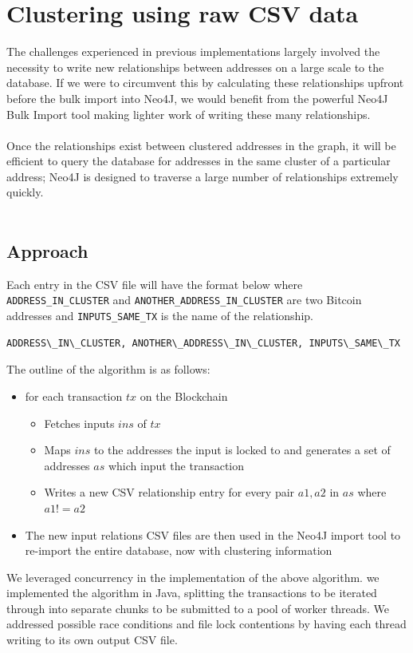 \section{Clustering using raw CSV data}\label{clustering-raw-csv}
The challenges experienced in previous implementations largely involved the necessity to write new relationships between addresses on a large scale to the database. If we were to circumvent this by calculating these relationships upfront before the bulk import into Neo4J, we would benefit from the powerful Neo4J Bulk Import tool making lighter work of writing these many relationships. 
\\\\
Once the relationships exist between clustered addresses in the graph, it will be efficient to query the database for addresses in the same cluster of a particular address;  Neo4J is designed to traverse a large number of relationships extremely quickly. 
\\\\

\subsection{Approach}
Each entry in the CSV file will have the format below where \texttt{ADDRESS\_IN\_CLUSTER} and \texttt{ANOTHER\_ADDRESS\_IN\_CLUSTER} are two Bitcoin addresses and \texttt{INPUTS\_SAME\_TX} is the name of the relationship. 

\begin{lstlisting}
ADDRESS\_IN\_CLUSTER, ANOTHER\_ADDRESS\_IN\_CLUSTER, INPUTS\_SAME\_TX
\end{lstlisting}

The outline of the algorithm is as follows:
\begin{itemize}
    \item for each transaction $tx$ on the Blockchain
    \begin{itemize}
        \item Fetches inputs $ins$ of $tx$
        \item Maps $ins$ to the addresses the input is locked to and generates a set of addresses $as$ which input the transaction 
        \item Writes a new CSV relationship entry for every pair $a1, a2$ in $as$ where $a1 != a2$
    \end{itemize}
    \item The new input relations CSV files are then used in the Neo4J import tool to re-import the entire database, now with clustering information
\end{itemize}
We leveraged concurrency in the implementation of the above algorithm. we implemented the algorithm in Java, splitting the transactions to be iterated through into separate chunks to be submitted to a pool of worker threads. We addressed possible race conditions and file lock contentions by having each thread writing to its own output CSV file.  